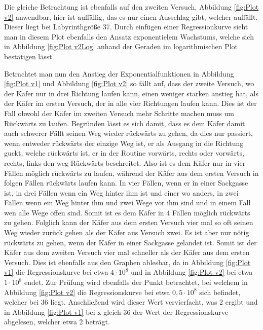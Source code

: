 \documentclass[12pt, a4paper, titlepage]{article}
\begin{document}
Die gleiche Betrachtung ist ebenfalls auf den zweiten Versuch, Abbildung \ref{fig:Plot v2} anwendbar, hier ist auffällig, das es nur einen Ausschlag gibt, welcher auffällt.
Dieser liegt bei Labyrinthgröße 37.
Durch einfügen einer Regressionkurve sieht man in diesem Plot ebenfalls den Ansatz exponentielem Wachstums, welche sich in Abbildung \ref{fig:Plot v2Log} anhand der Geraden im logarithmischen Plot bestätigen lässt.

\bigskip

Betrachtet man nun den Anstieg der Exponentialfunktionen in Abbildung \ref{fig:Plot v1} und Abbildung \ref{fig:Plot v2} so fällt auf, dass der zweite Versuch, wo der Käfer nur in drei Richtung laufen kann, einen weniger starken anstieg hat, als der Käfer im ersten Versuch, der in alle vier Richtungen laufen kann.
Dies ist der Fall obwohl der Käfer im zweiten Versuch mehr Schritte machen muss um Rückwärts zu laufen.
Begründen lässt es sich damit, dass es dem Käfer damit auch schwerer Fällt seinen Weg wieder rückwärts zu gehen, da dies nur passiert, wenn entweder rückwärts der einzige Weg ist, er als Ausgang in die Richtung guckt, welche rückwärts ist, er in der Routine vorwärts, rechts oder vorwärts, rechts, links den weg Rückwärts beschreitet.
Also ist es dem Käfer nur in vier Fällen möglich rückwärts zu laufen, während der Käfer aus dem ersten Versuch in folgen Fällen rückwärts laufen kann.
In vier Fällen, wenn er in einer Sackgasse ist, in drei Fällen wenn ein Weg hinter ihm ist und einer wo anders, in zwei Fällen wenn ein Weg hinter ihm und zwei Wege vor ihm sind und in einem Fall wen alle Wege offen sind.
Somit ist es dem Käfer in 4 Fällen möglich rückwärts zu gehen.
Folglich kann der Käfer aus dem ersten Versuch vier mal so oft seinen Weg wieder zurück gehen als der Käfer aus Versuch zwei.
Es ist aber nur nötig rückwärts zu gehen, wenn der Käfer in einer Sackgasse gelandet ist.
Somit ist der Käfer aus dem zweiten Versuch vier mal schneller als der Käfer aus dem ersten Versuch.
Dies ist ebenfalls aus den Graphen ablesbar, da in Abbildung \ref{fig:Plot v1} die Regressionskurve bei etwa $4 \cdot 10^8$ und in Abbildung \ref{fig:Plot v2} bei etwa $1 \cdot 10^8$ endet.
Zur Prüfung wird ebenfalls der Punkt betrachtet, bei welchem in Abbildung \ref{fig:Plot v2} die Regressionskurve bei etwa $0,5 \cdot 10^8$ sich befindet, welcher bei 36 liegt.
Anschließend wird dieser Wert vervierfacht, was 2 ergibt und in Abbildung \ref{fig:Plot v1} bei x gleich 36 der Wert der Regressionskurve abgelesen, welcher etwa 2 beträgt.
\end{document}
